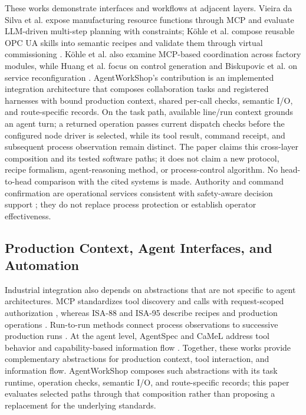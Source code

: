 These works demonstrate interfaces and workflows at adjacent layers.
Vieira da Silva et al. expose manufacturing resource functions through MCP
and evaluate LLM-driven multi-step planning with constraints; K{\"o}hle et al.
compose reusable OPC UA skills into semantic recipes and validate them through
virtual commissioning \cite{silva2025mcpmanufacturing,koehle2025semanticrecipes}.
K{\"o}hle et al. also examine MCP-based coordination across factory modules,
while Huang et al. focus on control generation and Biskupovic et al. on
service reconfiguration \cite{koehle2026llmdriven,huang2026made,biskupovic2025supervision}.
AgentWorkShop's contribution is an implemented integration architecture that
composes collaboration tasks and registered harnesses with bound production
context, shared per-call checks, semantic I/O, and route-specific records.
On the task path, available line/run context grounds an agent turn; a returned
operation passes current dispatch checks before the configured node driver is
selected, while its tool result, command receipt, and subsequent process
observation remain distinct. The paper claims this cross-layer composition
and its tested software paths; it does not claim a new protocol, recipe
formalism, agent-reasoning method, or process-control algorithm. No
head-to-head comparison with the cited systems is made.
Authority and command confirmation are operational services consistent with
safety-aware decision support \cite{jiang2026agentic}; they do not replace
process protection or establish operator effectiveness.

\subsection{Production Context, Agent Interfaces, and Automation}
Industrial integration also depends on abstractions that are not specific to
agent architectures. MCP standardizes tool discovery and calls with
request-scoped authorization \cite{mcp2024}, whereas
ISA-88 and ISA-95 describe recipes and production operations
\cite{isa88_2010,isa95_2025}. Run-to-run methods connect process observations
to successive production runs \cite{moyne2000r2r}. At the agent level,
AgentSpec and CaMeL address tool behavior and capability-based information
flow \cite{wang2025agentspec,debenedetti2025camel}. Together, these works
provide complementary abstractions for production context, tool interaction,
and information flow. AgentWorkShop composes such abstractions with its task
runtime, operation checks, semantic I/O, and route-specific records; this
paper evaluates selected paths through that composition rather than proposing
a replacement for the underlying standards.

